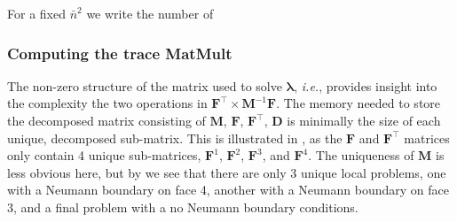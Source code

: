 For a fixed $\bar{n}^2$ we write the number of 

%
%
%
\subsubsection{Computing the trace MatMult} 

%
%
%
The non-zero structure of the matrix used to solve $\symbf{\lambda}$, \emph{i.e.},  provides insight into the complexity the two operations in $\textbf{F}^{\intercal} \times \textbf{M}^{-1} \textbf{F}$. 
The memory needed to store the decomposed matrix consisting of $\textbf{M}$, $\textbf{F}$, $\textbf{F}^{\intercal}$, $\textbf{D}$ is minimally the size of each unique, decomposed sub-matrix. 
This is illustrated in , as the $\textbf{F}$ and $\textbf{F}^{\intercal}$ matrices only contain 4 unique sub-matrices, $\textbf{F}^{1}$, $\textbf{F}^{2}$, $\textbf{F}^{3}$, and $\textbf{F}^{4}$. 
The uniqueness of $\textbf{M}$ is less obvious here, but by  we see that there are only 3 unique local problems, one with a Neumann boundary on face 4, another with a Neumann boundary on face 3, and a final problem with a no Neumann boundary conditions.

